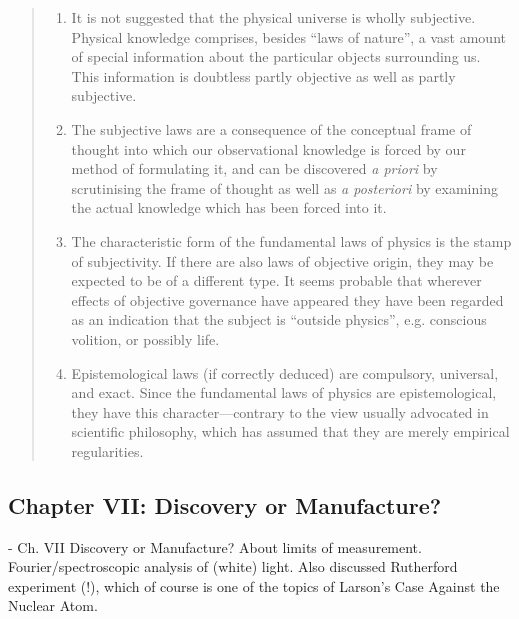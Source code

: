 \begin{quote}
\begin{enumerate}
        \item It is not suggested that the physical universe is wholly subjective.  Physical knowledge comprises, besides ``laws of nature'', a vast amount of special information about the particular objects surrounding us.  This information is doubtless partly objective as well as partly subjective.
        \item The subjective laws are a consequence of the conceptual frame of thought into which our observational knowledge is forced by our method of formulating it, and can be discovered \emph{a priori} by scrutinising the frame of thought as well as \emph{a posteriori} by examining the actual knowledge which has been forced into it.
        \item The characteristic form of the fundamental laws of physics is the stamp of subjectivity.  If there are also laws of objective origin, they may be expected to be of a different type.  It seems probable that wherever effects of objective governance have appeared they have been regarded as an indication that the subject is ``outside physics'', e.g. conscious volition, or possibly life.
        \item Epistemological laws (if correctly deduced) are compulsory, universal, and exact.  Since the fundamental laws of physics are epistemological, they have this character---contrary to the view usually advocated in scientific philosophy, which has assumed that they are merely empirical regularities.\citep[p. 102-105]{Eddington1939}
    \end{enumerate}
\end{quote}

\subsection{Chapter VII: Discovery or Manufacture?}

- Ch. VII Discovery or Manufacture?  About limits of measurement.  Fourier/spectroscopic analysis of (white) light.  Also discussed Rutherford experiment (!), which of course is one of the topics of Larson's Case Against the Nuclear Atom.

